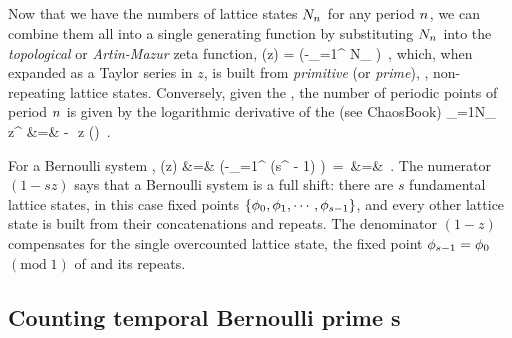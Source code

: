 \subsection{\Tzeta}
\label{s:bernZeta}

Now that we have the numbers of lattice states $N_{{n_{}}}$ for any
period ${n_{}}$, we can combine them all into a single generating function by
substituting $N_{{n_{}}}$ into the {\em topological} or {\em Artin-Mazur}
zeta func\-tion,
\beq
\zetatop(z) =
     \exp\left(-\sum_{\cl{}=1}^\infty
{} N_\cl{}
         \right)
\,,
which, when expanded as a Taylor series in $z$, is built from
\emph{primitive} (or \emph{prime}), \ie, non-repeating lattice
states. Conversely, given the \tzeta, the number of periodic
points of period $\cl{}$ is given by the logarithmic derivative of the
{\tzeta} (see
{ChaosBook})
\bea
\sum_{\cl{}=1}N_\cl{} z^\cl{}
    &=& - \,\,z (\zetatop)
\,.
\label{zetatop-N}
\eea

For a Bernoulli system ,
\bea
\zetatop(z)
 &=&  \exp \left(-\sum_{\cl{}=1}^\infty
{} ({s}^\cl{} - 1)
         \right)
\,=\,
\exp \left[\ln(1 -  {s}z) - \ln(1 - z) \right]
\continue
 &=&
\,.
\label{BernZeta}
\eea
The numerator $(1 - {s}z)$ says that a Bernoulli system is a full
shift: there are $s$ fundamental lattice states, in this case
fixed points $\{\phi_0,\phi_1,\cdots,\phi_{s-1}\}$, and every other
lattice state is built from their concatenations and repeats. The
denominator $(1 - z)$ compensates for the single overcounted lattice
state, the fixed point $\phi_{{s}-1}=\phi_{0}$ $(\mbox{mod}\;1)$ of
 and its repeats.

\subsection{Counting {temporal Bernoulli} prime \po s}
\label{s:bernPrime}

